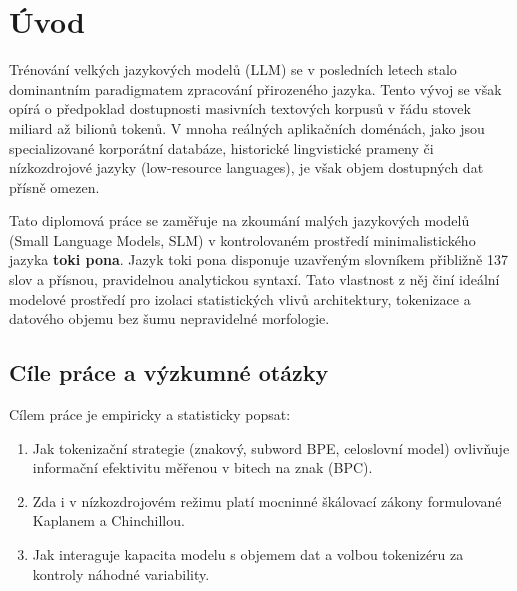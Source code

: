 \chapter{Úvod}
\label{chap:intro}

Trénování velkých jazykových modelů (LLM) se v posledních letech stalo dominantním paradigmatem zpracování přirozeného jazyka. Tento vývoj se však opírá o předpoklad dostupnosti masivních textových korpusů v řádu stovek miliard až bilionů tokenů. V mnoha reálných aplikačních doménách, jako jsou specializované korporátní databáze, historické lingvistické prameny či nízkozdrojové jazyky (low-resource languages), je však objem dostupných dat přísně omezen.

Tato diplomová práce se zaměřuje na zkoumání malých jazykových modelů (Small Language Models, SLM) v kontrolovaném prostředí minimalistického jazyka \textbf{toki pona}. Jazyk toki pona disponuje uzavřeným slovníkem přibližně 137 slov a přísnou, pravidelnou analytickou syntaxí. Tato vlastnost z něj činí ideální modelové prostředí pro izolaci statistických vlivů architektury, tokenizace a datového objemu bez šumu nepravidelné morfologie.

\section{Cíle práce a výzkumné otázky}
Cílem práce je empiricky a statisticky popsat:
\begin{enumerate}
    \item Jak tokenizační strategie (znakový, subword BPE, celoslovní model) ovlivňuje informační efektivitu měřenou v bitech na znak (BPC).
    \item Zda i v nízkozdrojovém režimu platí mocninné škálovací zákony formulované Kaplanem a Chinchillou.
    \item Jak interaguje kapacita modelu s objemem dat a volbou tokenizéru za kontroly náhodné variability.
\end{enumerate}
